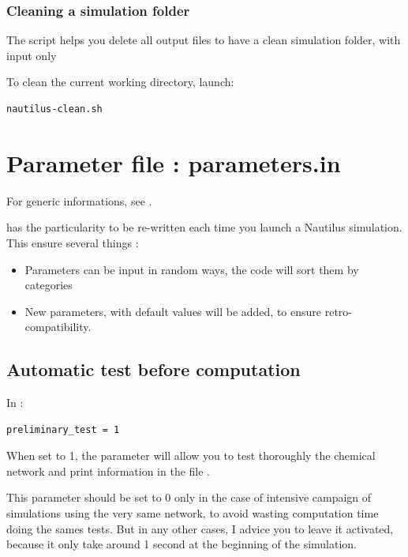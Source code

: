 \documentclass[english,a4paper,twoside]{article}
\begin{document}
\subsubsection{Cleaning a simulation folder}
The script  helps you delete all output files to have a clean simulation folder, with input only

To clean the current working directory, launch:
\begin{verbatim}
nautilus-clean.sh
\end{verbatim}

\section{Parameter file : parameters.in}\label{sec:parameters_in}
For generic informations, see .

 has the particularity to be re-written each time you launch a Nautilus simulation. This ensure several things :
\begin{itemize}
\item Parameters can be input in random ways, the code will sort them by categories
\item New parameters, with default values will be added, to ensure retro-compatibility.
\end{itemize}

\subsection{Automatic test before computation}
In : 
\begin{verbatim}
preliminary_test = 1
\end{verbatim}

When set to 1, the parameter  will allow you to test thoroughly the chemical network and print information in the file . 

\begin{remarque}
This parameter should be set to 0 only in the case of intensive campaign of simulations using the very same network, to avoid wasting computation time doing the sames tests. But in any other cases, I advice you to leave it activated, because it only take around 1 second at the beginning of the simulation.
\end{remarque}
\end{document}
